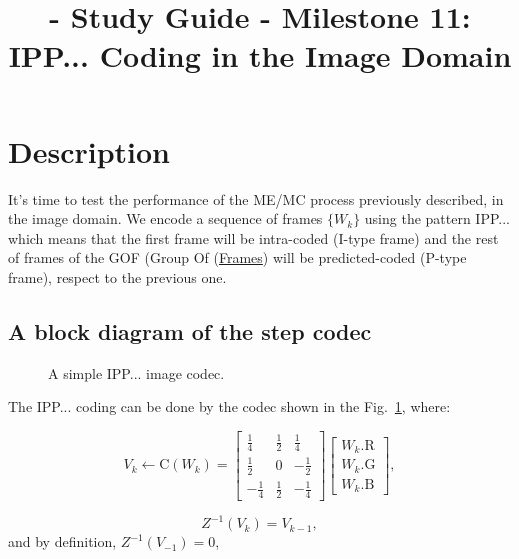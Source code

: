 
\title{\SM{} - Study Guide - Milestone 11: IPP... Coding in the Image Domain}

\maketitle

\tableofcontents

\section{Description}

It's time to test the performance of the ME/MC process previously
described, in the image domain. We encode a sequence of
frames $\{W_k\}$ using the pattern IPP... which means that the first
frame will be intra-coded (I-type frame) and the rest of frames of the
GOF (Group Of
(\href{https://en.wikipedia.org/wiki/Group_of_pictures}{Frames}) will
be predicted-coded (P-type frame), respect to the previous one.

\subsection{A block diagram of the step codec}

\begin{figure}
  \centering
  \caption{A simple IPP... image codec.}
\label{fig:IPP_codec}
\end{figure}

The IPP... coding can be done by the codec shown in the
Fig.~\ref{fig:IPP_codec}, where:

\begin{equation}
  V_k \leftarrow \text{C}(W_k) =
  \begin{bmatrix}
    \frac{1}{4} &  \frac{1}{2}  &  \frac{1}{4} \\ 
    \frac{1}{2} &            0  & -\frac{1}{2} \\
    -\frac{1}{4} &  \frac{1}{2}  & -\frac{1}{4}
  \end{bmatrix}
  \begin{bmatrix}
    W_k.\text{R} \\
    W_k.\text{G} \\
    W_k.\text{B}
  \end{bmatrix}
  , \tag{a}
\end{equation}

\begin{equation}
  Z^{-1}(V_k) = V_{k-1},
  \tag{b}
\end{equation}
and by definition, $Z^{-1}(V_{-1}) = 0$,

